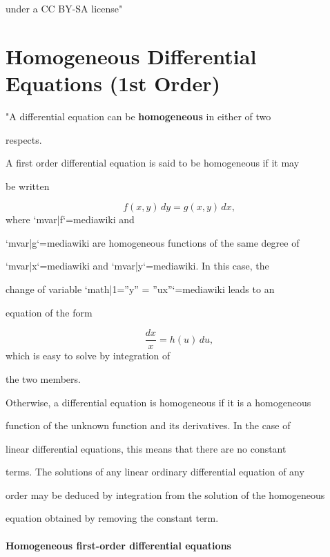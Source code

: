     under a CC BY-SA license"

\section{Homogeneous Differential Equations (1st Order)}
\label{sec:homogeneous-differential-equations-1st-order}

"A differential equation can be \textbf{homogeneous} in either of two

respects.



A first order differential equation is said to be homogeneous if it may

be written



$$f(x,y) \, dy = g(x,y) \, dx,$$ where `{{mvar|f}}`{=mediawiki} and

`{{mvar|g}}`{=mediawiki} are homogeneous functions of the same degree of

`{{mvar|x}}`{=mediawiki} and `{{mvar|y}}`{=mediawiki}. In this case, the

change of variable `{{math|1=''y'' = ''ux''}}`{=mediawiki} leads to an

equation of the form



$$\frac{dx}{x} = h(u) \, du,$$ which is easy to solve by integration of

the two members.



Otherwise, a differential equation is homogeneous if it is a homogeneous

function of the unknown function and its derivatives. In the case of

linear differential equations, this means that there are no constant

terms. The solutions of any linear ordinary differential equation of any

order may be deduced by integration from the solution of the homogeneous

equation obtained by removing the constant term.



\paragraph{Homogeneous first-order differential equations}



